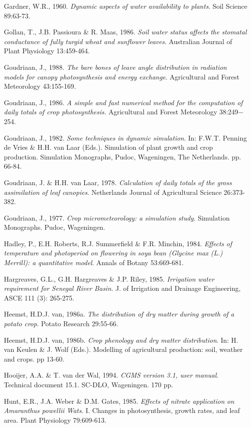 Gardner, W.R., 1960. {\it Dynamic aspects of water availability to plants\/}. Soil Science 89:63-73.

Gollan, T., J.B. Passioura \& R. Maas, 1986. {\it Soil water status affects the stomatal
conductance of fully turgid wheat and sunflower leaves\/}. Australian Journal of Plant
Physiology 13:459-464.

Goudriaan, J., 1988. {\it The bare bones of leave angle distribution in radiation models for
canopy photosynthesis and energy exchange\/}. Agricultural and Forest Meteorology 43:155-169.

Goudriaan, J., 1986. {\it A simple and fast numerical method for the computation of daily totals
of crop photosynthesis.\/} Agricultural and Forest Meteorology 38:249$-$254. 

Goudriaan, J., 1982. {\it Some techniques in dynamic simulation\/}. In:  F.W.T. Penning de Vries
\& H.H. van Laar (Eds.). Simulation of plant growth and crop production. Simulation
Monographs, Pudoc, Wageningen, The Netherlands. pp. 66-84.

Goudriaan, J. \& H.H. van Laar, 1978. {\it Calculation of daily totals of the gross assimilation
of leaf canopies\/}. Netherlands Journal of Agricultural Science 26:373-382.

Goudriaan, J., 1977. {\it Crop micrometeorology: a simulation study\/}. Simulation Monographs.
Pudoc, Wageningen.

Hadley, P., E.H. Roberts, R.J. Summerfield \& F.R. Minchin, 1984. {\it Effects of temperature
and photoperiod on flowering in soya bean (Glycine max (L.) Merrill): a quantitative model\/}.
Annals of Botany 53:669-681.

Hargreaves, G.L., G.H. Hargreaves \& J.P. Riley, 1985. {\it Irrigation water requirement for
Senegal River Basin.\/} J. of Irrigation and Drainage Engineer\-ing, ASCE 111 (3): 265-275.

Heemst, H.D.J. van, 1986a. {\it The distribution of dry matter during growth of a potato crop\/}. Potato
Research 29:55-66. 

Heemst, H.D.J. van, 1986b. {\it Crop phenology and dry matter distribution\/}. In:  H. van Keulen \& J.
Wolf (Eds.). Modelling of agricultural production: soil, weather and crops. pp 13-60.

Hooijer, A.A. \& T. van der Wal, 1994. {\it CGMS version 3.1, user manual\/}. Technical document 15.1.
SC-DLO, Wageningen. 170 pp.

Hunt, E.R., J.A. Weber \& D.M. Gates, 1985. {\it Effects of nitrate application on Amaranthus powellii
Wats\/}. I. Changes in photosynthesis, growth rates, and leaf area. Plant Physiology 79:609-613.

